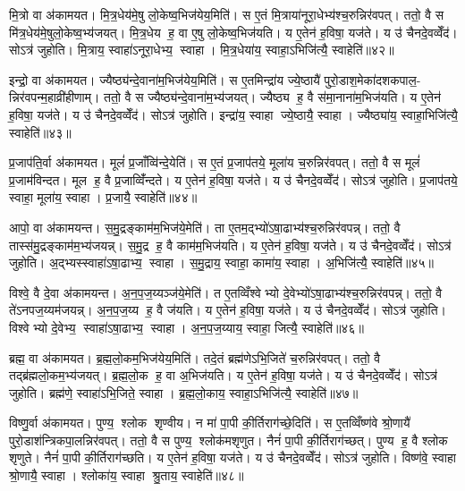 मि॒त्रो वा अ॑कामयत। मि॒त्र॒धेय॑मे॒षु लो॒केष्व॒भिज॑येय॒मिति॑। स ए॒तं मि॒त्राया॑नूरा॒धेभ्य॑श्च॒रुन्निर॑वपत्। ततो॒ वै स मि॑त्र॒धेय॑मे॒षुलो॒केष्व॒भ्य॑जयत्। मि॒त्र॒धेय ह॒ वा ए॒षु लो॒केष्व॒भिज॑यति। य ए॒तेन॑ ह॒विषा॒ यज॑ते। य उ॑ चैनदे॒वव्वेँद॑। सोऽत्र॑ जुहोति। मि॒त्राय॒ स्वाहा॑ऽनूरा॒धेभ्य॒ स्वाहा। मि॒त्र॒धेया॑य॒ स्वाहा॒ऽभिजि॑त्यै॒ स्वाहेति॑॥४२॥

इन्द्रो॒ वा अ॑कामयत। ज्यैष्ठ्य॑न्दे॒वाना॑म॒भिज॑येय॒मिति॑। स ए॒तमिन्द्रा॑य ज्ये॒ष्ठायै॑ पुरो॒डाश॒मेका॑दशकपाल॒- न्निर॑वपन्म॒हाव्री॑हीणाम्। ततो॒ वै स ज्यैष्ठ्य॑न्दे॒वाना॑म॒भ्य॑जयत्। ज्यैष्ठ्य ह॒ वै स॑मा॒नाना॑म॒भिज॑यति। य ए॒तेन॑ ह॒विषा॒ यज॑ते। य उ॑ चैनदे॒वव्वेँद॑। सोऽत्र॑ जुहोति। इन्द्रा॑य॒ स्वाहा ज्ये॒ष्ठायै॒ स्वाहा। ज्यैष्ठ्या॑य॒ स्वाहा॒भिजि॑त्यै॒ स्वाहेति॑॥४३॥

प्र॒जाप॑ति॒र्वा अ॑कामयत। मूलं॑ प्र॒जाँव्वि॑न्दे॒येति॑। स ए॒तं प्र॒जाप॑तये॒ मूला॑य च॒रुन्निर॑वपत्। ततो॒ वै स मूलं॑ प्र॒जाम॑विन्दत। मूल ह॒ वै प्र॒जाव्विँ॑न्दते। य ए॒तेन॑ ह॒विषा॒ यज॑ते। य उ॑ चैनदे॒वव्वेँद॑। सोऽत्र॑ जुहोति। प्र॒जाप॑तये॒ स्वाहा॒ मूला॑य॒ स्वाहा। प्र॒जायै॒ स्वाहेति॑॥४४॥

आपो॒ वा अ॑कामयन्त। स॒मु॒द्रङ्काम॑म॒भिज॑ये॒मेति॑। ता ए॒तम॒द्भ्यो॑ऽषा॒ढाभ्य॑श्च॒रुन्निर॑वपन्न्। ततो॒ वै तास्स॑मु॒द्रङ्काम॑म॒भ्य॑जयन्न्। स॒मु॒द्र ह॒ वै काम॑म॒भिज॑यति। य ए॒तेन॑ ह॒विषा॒ यज॑ते। य उ॑ चैनदे॒वव्वेँद॑। सोऽत्र॑ जुहोति। अ॒द्भ्यस्स्वाहा॑ऽषा॒ढाभ्य॒ स्वाहा। स॒मु॒द्राय॒ स्वाहा॒ कामा॑य॒ स्वाहा। अ॒भिजि॑त्यै॒ स्वाहेति॑॥४५॥

विश्वे॒ वै दे॒वा अ॑कामयन्त। अ॒न॒प॒ज॒य्यञ्ज॑ये॒मेति॑। त ए॒तव्विँश्वेभ्यो दे॒वेभ्यो॑ऽषा॒ढाभ्य॑श्च॒रुन्निर॑वपन्न्। ततो॒ वै ते॑ऽनपज॒य्यम॑जयन्न्। अ॒न॒प॒ज॒य्य ह॒ वै ज॑यति। य ए॒तेन॑ ह॒विषा॒ यज॑ते। य उ॑ चैनदे॒वव्वेँद॑। सोऽत्र॑ जुहोति। विश्वेभ्यो दे॒वेभ्य॒ स्वाहा॑ऽषा॒ढाभ्य॒ स्वाहा। अ॒न॒प॒ज॒य्याय॒ स्वाहा॒ जित्यै॒ स्वाहेति॑॥४६॥

ब्रह्म॒ वा अ॑कामयत। ब्र॒ह्म॒लो॒कम॒भिज॑येय॒मिति॑। तदे॒तं ब्रह्म॑णेऽभि॒जिते॑ च॒रुन्निर॑वपत्। ततो॒ वै तद्ब्र॑ह्मलो॒कम॒भ्य॑जयत्। ब्र॒ह्म॒लो॒क ह॒ वा अ॒भिज॑यति। य ए॒तेन॑ ह॒विषा॒ यज॑ते। य उ॑ चैनदे॒वव्वेँद॑। सोऽत्र॑ जुहोति। ब्रह्म॑णे॒ स्वाहा॑ऽभि॒जिते॒ स्वाहा। ब्र॒ह्म॒लो॒काय॒ स्वाहा॒ऽभिजि॑त्यै॒ स्वाहेति॑॥४७॥

विष्णु॒र्वा अ॑कामयत। पुण्य॒ श्लोक शृण्वीय। न मा॑ पा॒पी की॒र्तिराग॑च्छे॒दिति॑। स ए॒तव्विँष्ण॑वे श्रो॒णायै॑ पुरो॒डाश॑न्त्रिकपा॒लन्निर॑वपत्। ततो॒ वै स पुण्य॒ श्लोक॑मशृणुत। नैनं॑ पा॒पी की॒र्तिराग॑च्छत्। पुण्य ह॒ वै श्लोक शृणुते। नैनं॑ पा॒पी की॒र्तिराग॑च्छति। य ए॒तेन॑ ह॒विषा॒ यज॑ते। य उ॑ चैनदे॒वव्वेँद॑। सोऽत्र॑ जुहोति। विष्ण॑वे॒ स्वाहा श्रो॒णायै॒ स्वाहा। श्लोका॑य॒ स्वाहा श्रु॒ताय॒ स्वाहेति॑॥४८॥

